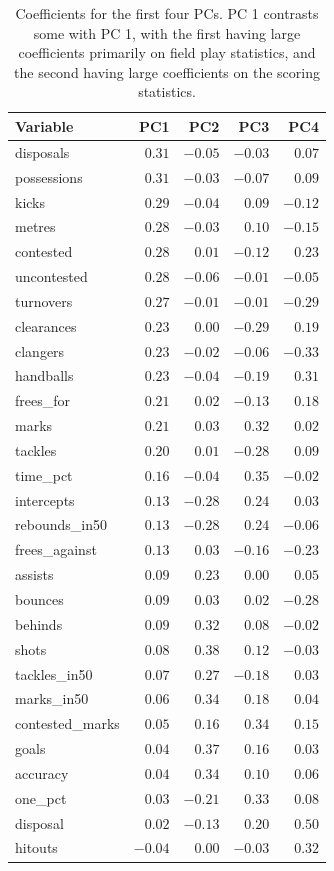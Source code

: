 \documentclass[
  letterpaper,
]{krantz}
\begin{document}
\begin{longtable}{lrrrr}

\caption{\label{tbl-aflw-pcs}Coefficients for the first four PCs. PC 1
contrasts some with PC 1, with the first having large coefficients
primarily on field play statistics, and the second having large
coefficients on the scoring statistics.}

\tabularnewline

\toprule
Variable & PC1 & PC2 & PC3 & PC4 \\ 
\midrule
disposals & $0.31$ & $-0.05$ & $-0.03$ & $0.07$ \\ 
possessions & $0.31$ & $-0.03$ & $-0.07$ & $0.09$ \\ 
kicks & $0.29$ & $-0.04$ & $0.09$ & $-0.12$ \\ 
metres & $0.28$ & $-0.03$ & $0.10$ & $-0.15$ \\ 
contested & $0.28$ & $0.01$ & $-0.12$ & $0.23$ \\ 
uncontested & $0.28$ & $-0.06$ & $-0.01$ & $-0.05$ \\ 
turnovers & $0.27$ & $-0.01$ & $-0.01$ & $-0.29$ \\ 
clearances & $0.23$ & $0.00$ & $-0.29$ & $0.19$ \\ 
clangers & $0.23$ & $-0.02$ & $-0.06$ & $-0.33$ \\ 
handballs & $0.23$ & $-0.04$ & $-0.19$ & $0.31$ \\ 
frees\_for & $0.21$ & $0.02$ & $-0.13$ & $0.18$ \\ 
marks & $0.21$ & $0.03$ & $0.32$ & $0.02$ \\ 
tackles & $0.20$ & $0.01$ & $-0.28$ & $0.09$ \\ 
time\_pct & $0.16$ & $-0.04$ & $0.35$ & $-0.02$ \\ 
intercepts & $0.13$ & $-0.28$ & $0.24$ & $0.03$ \\ 
rebounds\_in50 & $0.13$ & $-0.28$ & $0.24$ & $-0.06$ \\ 
frees\_against & $0.13$ & $0.03$ & $-0.16$ & $-0.23$ \\ 
assists & $0.09$ & $0.23$ & $0.00$ & $0.05$ \\ 
bounces & $0.09$ & $0.03$ & $0.02$ & $-0.28$ \\ 
behinds & $0.09$ & $0.32$ & $0.08$ & $-0.02$ \\ 
shots & $0.08$ & $0.38$ & $0.12$ & $-0.03$ \\ 
tackles\_in50 & $0.07$ & $0.27$ & $-0.18$ & $0.03$ \\ 
marks\_in50 & $0.06$ & $0.34$ & $0.18$ & $0.04$ \\ 
contested\_marks & $0.05$ & $0.16$ & $0.34$ & $0.15$ \\ 
goals & $0.04$ & $0.37$ & $0.16$ & $0.03$ \\ 
accuracy & $0.04$ & $0.34$ & $0.10$ & $0.06$ \\ 
one\_pct & $0.03$ & $-0.21$ & $0.33$ & $0.08$ \\ 
disposal & $0.02$ & $-0.13$ & $0.20$ & $0.50$ \\ 
hitouts & $-0.04$ & $0.00$ & $-0.03$ & $0.32$ \\ 
\bottomrule

\end{longtable}
\end{document}
